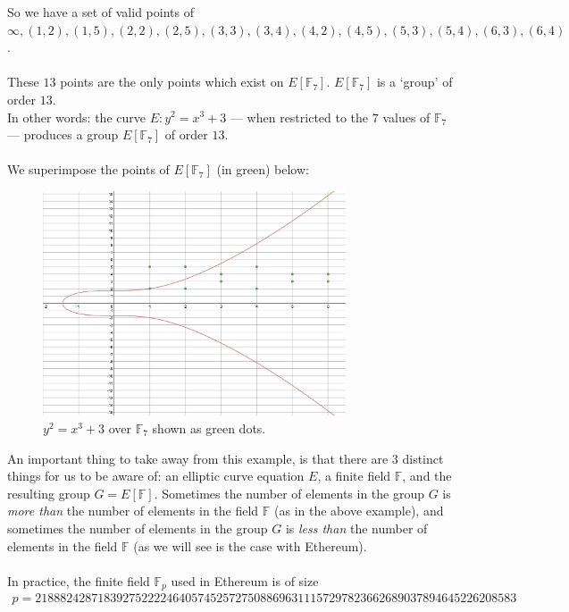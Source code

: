 So we have a set of valid points of $\infty, (1,2), (1,5), (2,2), (2,5), (3,3), (3,4), (4,2), (4,5), (5,3), (5,4), (6,3), (6,4)$.\\
\\
These $13$ points are the only points which exist on $E[\mathbb{F}_7]$. $E[\mathbb{F}_7]$ is a `group' of order $13$.\\
In other words: the curve $E: y^2 = x^3 + 3$ --- when restricted to the $7$ values of $\mathbb{F}_7$ --- produces a group $E[\mathbb{F}_7]$ of order $13$.\\
\\
We superimpose the points of $E[\mathbb{F}_7]$ (in green) below:
\begin{figure}[H]
	\begin{center}
		\includegraphics[width=0.8\textwidth]{images/ellipticCurveF7.png}
	\end{center}
	\caption{$y^2 = x^3 + 3$ over $\mathbb{F}_7$ shown as green dots.}
	\label{pic:ftShield}
\end{figure}

An important thing to take away from this example, is that there are 3 distinct things for us to be aware of: an elliptic curve equation $E$, a finite field $\mathbb{F}$, and the resulting group $G = E[\mathbb{F}]$. Sometimes the number of elements in the group $G$ is \textit{more than} the number of elements in the field $\mathbb{F}$ (as in the above example), and sometimes the number of elements in the group $G$ is \textit{less than} the number of elements in the field $\mathbb{F}$ (as we will see is the case with Ethereum).\\
\\
In practice, the finite field $\mathbb{F}_p$ used in Ethereum is of size
\begin{align*}
    p = 21888242871839275222246405745257275088696311157297823662689037894645226208583
\end{align*}

